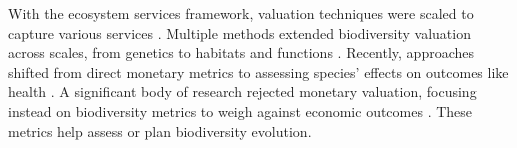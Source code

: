 With the ecosystem services framework, valuation techniques were scaled to capture various services \citep{Costanza1997}. Multiple methods extended biodiversity valuation across scales, from genetics to habitats and functions \citep{bartkowski_capturing_2015}.
Recently, approaches shifted from direct monetary metrics to assessing species' effects on outcomes like health \citep{frank_social_nodate,frank_economic_2024}. A significant body of research rejected monetary valuation, focusing instead on biodiversity metrics to weigh against economic outcomes \citep{Mouysset2011, Watzold2016a}. These metrics help assess or plan biodiversity evolution.

